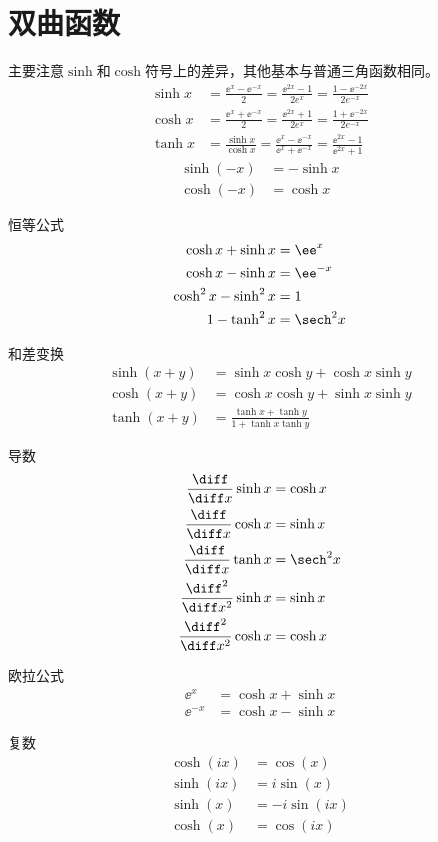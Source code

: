 
\newpage
\appendix
\section{双曲函数}
主要注意$\sinh$和$\cosh$符号上的差异，其他基本与普通三角函数相同。
\[\begin{aligned}
\sinh x&=\frac {\ee^{x}-\ee^{-x}}{2}={\frac {\ee^{2x}-1}{2e^{x}}}={\frac {1-\ee^{-2x}}{2e^{-x}}}\\
\cosh x&={\frac {\ee^{x}+\ee^{-x}}{2}}={\frac {\ee^{2x}+1}{2e^{x}}}={\frac {1+\ee^{-2x}}{2e^{-x}}}\\
\tanh x&={\frac {\sinh x}{\cosh x}}=\frac {\ee^{x}-\ee^{-x}}{\ee^{x}+\ee^{-x}}={\frac {\ee^{2x}-1}{\ee^{2x}+1}}
\end{aligned}\]
\[\begin{aligned}
\sinh(-x)&=-\sinh x\\
\cosh(-x)&=\cosh x
\end{aligned}\]

恒等公式
\[{\begin{aligned}
\cosh x+\sinh x&=\ee^{x}\\
\cosh x-\sinh x&=\ee^{-x}\\
\cosh ^{2}x-\sinh ^{2}x&=1\\
1-\tanh^2 x&=\sech^2 x
\end{aligned}}\]

和差变换
\[{\displaystyle {\begin{aligned}
\sinh(x+y)&=\sinh x\cosh y+\cosh x\sinh y\\
\cosh(x+y)&=\cosh x\cosh y+\sinh x\sinh y\\
\tanh(x+y)&={\frac {\tanh x+\tanh y}{1+\tanh x\tanh y}}
\end{aligned}}}\]

导数
\[\begin{aligned}
{\frac {\diff}{\diff x}}\sinh x&=\cosh x\\
{\frac {\diff}{\diff x}}\cosh x&=\sinh x\\
{\frac {\diff}{\diff x}}\tanh x&=\sech^2 x\\
{\frac {\diff^{2}}{\diff x^{2}}}\sinh x&=\sinh x\\
{\frac {\diff^{2}}{\diff x^{2}}}\cosh x&=\cosh x
\end{aligned}\]

欧拉公式
\[\begin{aligned}
\displaystyle \ee^{x}&=\cosh x+\sinh x\\
\displaystyle \ee^{-x}&=\cosh x-\sinh x
\end{aligned}\]

复数
\[\begin{aligned}
\cosh(ix) &= \cos(x)\\
\sinh(ix) &= i\sin(x)\\
\sinh(x) &= -i\sin(ix)\\
\cosh(x) &= \cos(ix)
\end{aligned}\]